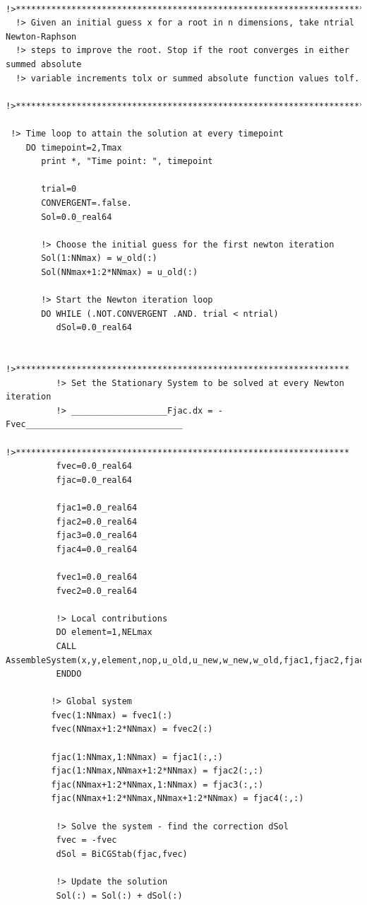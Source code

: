 \documentclass{article}
\begin{document}
\begin{verbatim}
  !>**********************************************************************************
  !> Given an initial guess x for a root in n dimensions, take ntrial Newton-Raphson
  !> steps to improve the root. Stop if the root converges in either summed absolute
  !> variable increments tolx or summed absolute function values tolf.
  !>**********************************************************************************
 
 !> Time loop to attain the solution at every timepoint
    DO timepoint=2,Tmax
       print *, "Time point: ", timepoint
 
       trial=0
       CONVERGENT=.false.
       Sol=0.0_real64

       !> Choose the initial guess for the first newton iteration
       Sol(1:NNmax) = w_old(:) 
       Sol(NNmax+1:2*NNmax) = u_old(:) 
 
       !> Start the Newton iteration loop
       DO WHILE (.NOT.CONVERGENT .AND. trial < ntrial)
          dSol=0.0_real64
          
          !>******************************************************************
          !> Set the Stationary System to be solved at every Newton iteration
          !> ___________________Fjac.dx = -Fvec_______________________________
          !>******************************************************************
          fvec=0.0_real64
          fjac=0.0_real64

          fjac1=0.0_real64
          fjac2=0.0_real64
          fjac3=0.0_real64
          fjac4=0.0_real64

          fvec1=0.0_real64
          fvec2=0.0_real64

          !> Local contributions
          DO element=1,NELmax
          CALL AssembleSystem(x,y,element,nop,u_old,u_new,w_new,w_old,fjac1,fjac2,fjac3,fjac4,fvec1,fvec2)
          ENDDO

         !> Global system 
         fvec(1:NNmax) = fvec1(:)
         fvec(NNmax+1:2*NNmax) = fvec2(:)

         fjac(1:NNmax,1:NNmax) = fjac1(:,:)
         fjac(1:NNmax,NNmax+1:2*NNmax) = fjac2(:,:)
         fjac(NNmax+1:2*NNmax,1:NNmax) = fjac3(:,:)
         fjac(NNmax+1:2*NNmax,NNmax+1:2*NNmax) = fjac4(:,:)

          !> Solve the system - find the correction dSol
          fvec = -fvec
          dSol = BiCGStab(fjac,fvec)
          
          !> Update the solution
          Sol(:) = Sol(:) + dSol(:)
         

\end{verbatim}
\end{document}
